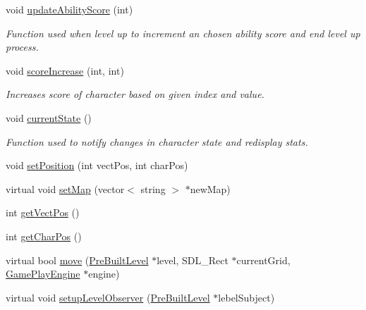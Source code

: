 \begin{DoxyCompactItemize}
void \hyperlink{class_characters_af3328b1a080cff8bab2af7597f98be6a}{update\+Ability\+Score} (int)
\begin{DoxyCompactList}\small\item\em Function used when level up to increment an chosen ability score and end level up process. \end{DoxyCompactList}\item 
\hypertarget{class_characters_aef5536d88930d9aff77844d9eec7c71c}{}\label{class_characters_aef5536d88930d9aff77844d9eec7c71c} 
void \hyperlink{class_characters_aef5536d88930d9aff77844d9eec7c71c}{score\+Increase} (int, int)
\begin{DoxyCompactList}\small\item\em Increases score of character based on given index and value. \end{DoxyCompactList}\item 
\hypertarget{class_characters_a4359f1dd1537ed6fac7f5ff47801e4ca}{}\label{class_characters_a4359f1dd1537ed6fac7f5ff47801e4ca} 
void \hyperlink{class_characters_a4359f1dd1537ed6fac7f5ff47801e4ca}{current\+State} ()
\begin{DoxyCompactList}\small\item\em Function used to notify changes in character state and redisplay stats. \end{DoxyCompactList}\item 
void \hyperlink{class_characters_a717e24c7c3c4cb1d78e5814a3f0df0db}{set\+Position} (int vect\+Pos, int char\+Pos)
\item 
virtual void \hyperlink{class_characters_a7ea2bd80b72476d35173691d31e80727}{set\+Map} (vector$<$ string $>$ $\ast$new\+Map)
\item 
int \hyperlink{class_characters_adb4cb606374d17c34f17846809306f91}{get\+Vect\+Pos} ()
\item 
int \hyperlink{class_characters_acaffff77a9e5713dec43ca2563cfe4dd}{get\+Char\+Pos} ()
\item 
virtual bool \hyperlink{class_characters_a2e5007e526b373bc2db936a6034c5064}{move} (\hyperlink{class_pre_built_level}{Pre\+Built\+Level} $\ast$level, S\+D\+L\+\_\+\+Rect $\ast$current\+Grid, \hyperlink{class_game_play_engine}{Game\+Play\+Engine} $\ast$engine)
\item 
virtual void \hyperlink{class_characters_a8e8a0b81e4be9eb6a1c75a5ae5d8bb27}{setup\+Level\+Observer} (\hyperlink{class_pre_built_level}{Pre\+Built\+Level} $\ast$lebel\+Subject)
\item 
\hypertarget{class_characters_acbb87a09e90ccc798464675933e59e66}{}\label{class_characters_acbb87a09e90ccc798464675933e59e66} 

\end{DoxyCompactItemize}
